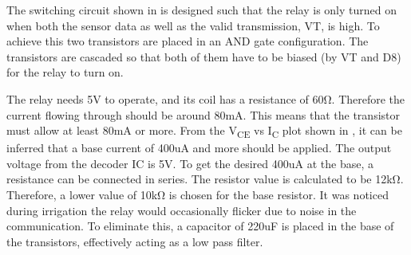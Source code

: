 \vspace*{12pt}
The switching circuit shown in  is designed such that the relay is only turned on when both the sensor data as well as the valid transmission, VT, is high. To achieve this two transistors are placed in an AND gate configuration. The transistors are cascaded so that both of them have to be biased (by VT and D8) for the relay to turn on.
\vspace*{12pt}



The relay needs 5V to operate, and its coil has a resistance of 60Ω. Therefore the current flowing through should be around 80mA. This means that the transistor must allow at least 80mA or more. From the V\textsubscript{CE} vs I\textsubscript{C} plot shown in , it can be inferred that a base current of 400uA and more should be applied. The output voltage from the decoder IC is 5V. To get the desired 400uA at the base, a resistance can be connected in series. The resistor value is calculated to be 12kΩ. Therefore, a lower value of 10kΩ is chosen for the base resistor. It was noticed during irrigation the relay would occasionally flicker due to noise in the communication. To eliminate this, a capacitor of 220uF is placed in the base of the transistors, effectively acting as a low pass filter.